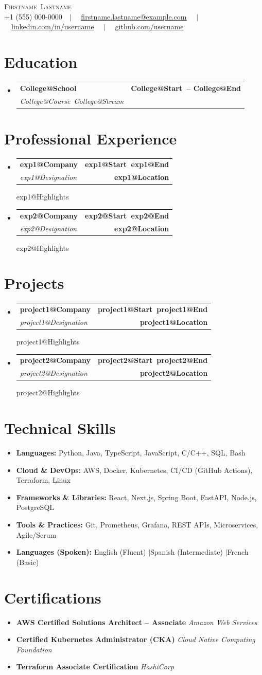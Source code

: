 \documentclass[letterpaper,11pt]{article}
\makeatletter
\newcommand{\resumeItem}[1]{
  \item\small{{#1 \vspace{-2pt}}}
}
\newcommand{\resumeSubheading}[4]{
  \vspace{2pt}\item
  \begin{tabular*}{1.0\textwidth}[t]{l@{\extracolsep{\fill}}r}
    \textbf{#1} & \textbf{\small #2} \\
    \textit{\small#3} & \textbf{\small #4} \\
  \end{tabular*}\vspace{-6pt}
}
\newcommand{\resumeSubHeadingListStart}{\begin{itemize}[leftmargin=0.0in, label={}, topsep=0pt, partopsep=0pt]}
\newcommand{\resumeSubHeadingListEnd}{\end{itemize}}
\newcommand{\resumeItemListStart}{\begin{itemize}[topsep=1pt, partopsep=0pt, parsep=0pt, itemsep=1.5pt]}
\newcommand{\resumeItemListEnd}{\end{itemize}\vspace{2pt}}
\def\firstname{Firstname}
\def\lastname{Lastname}
\def\email{firstname.lastname@example.com}
\def\linkedin{https://linkedin.com/in/username}
\def\github{https://github.com/username}
\def\jasphone{+1 (555) 000-0000}
\def\jbegin{\resumeItemListStart}
\def\jitem{\resumeItem}
\def\jend{\resumeItemListEnd}
\def\achievements{
  \jbegin
    \jitem{\textbf{Languages:} Python, Java, TypeScript, JavaScript, C/C++, SQL, Bash}
    \jitem{\textbf{Cloud \& DevOps:} AWS, Docker, Kubernetes, CI/CD (GitHub Actions), Terraform, Linux}
    \jitem{\textbf{Frameworks \& Libraries:} React, Next.js, Spring Boot, FastAPI, Node.js, PostgreSQL}
    \jitem{\textbf{Tools \& Practices:} Git, Prometheus, Grafana, REST APIs, Microservices, Agile/Scrum}
    \jitem{\textbf{Languages (Spoken):} English (Fluent) \quad$|$\quad Spanish (Intermediate) \quad$|$\quad French (Basic)}
  \jend
}
\def\certifications{
  \jbegin
    \jitem{\textbf{AWS Certified Solutions Architect -- Associate} \hfill \textit{Amazon Web Services}}
    \jitem{\textbf{Certified Kubernetes Administrator (CKA)} \hfill \textit{Cloud Native Computing Foundation}}
    \jitem{\textbf{Terraform Associate Certification} \hfill \textit{HashiCorp}}
  \jend
}
\def\titlesection{
  \begin{center}
    {\Huge \scshape \firstname\ \lastname} \\[3pt]
    \small
    \jasphone \ \ $|$ \ \ 
    \href{mailto:\email}{\underline{\email}} \ \ $|$ \ \ 
    \href{\linkedin}{\underline{linkedin.com/in/username}} \ \ $|$ \ \ 
    \href{\github}{\underline{github.com/username}}
    \vspace{-4pt}
  \end{center}
}
\newcommand{\renderExp}[1]{
  \resumeSubheading
    {\csname #1@Company\endcsname}{\csname #1@Start\endcsname\ \csname #1@End\endcsname}
    {\csname #1@Designation\endcsname}{\csname #1@Location\endcsname}
    \csname #1@Highlights\endcsname
}
\makeatother
\begin{document}
\titlesection

\section{Education}
\resumeSubHeadingListStart
  \resumeSubheading{\csname College@School\endcsname}{\csname College@Start\endcsname\ -- \csname College@End\endcsname}{\csname College@Course\endcsname\ \csname College@Stream\endcsname}{}
\resumeSubHeadingListEnd

\section{Professional Experience}
\resumeSubHeadingListStart
  \renderExp{exp1}
  \renderExp{exp2}
\resumeSubHeadingListEnd

\section{Projects}
\resumeSubHeadingListStart
  \renderExp{project1}
  \renderExp{project2}
\resumeSubHeadingListEnd

\section{Technical Skills}
\achievements

\section{Certifications}
\certifications
\end{document}
